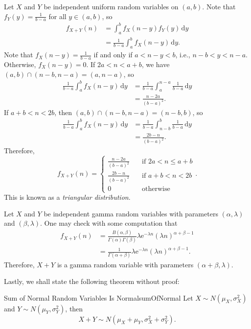 \documentclass[math]{amznotes}
\theoremstyle{remark}
\newcommand{\e}{\mathrm{e}}
\begin{document}
Let $X$ and $Y$ be independent uniform random variables on $(a, b)$. Note that $f_Y(y) = \frac{1}{b - a}$ for all $y \in (a, b)$, so
\begin{align*}
    f_{X + Y}(n) & = \int_{a}^{b}\!f_X(n - y)f_Y(y)\,\mathrm{d}y \\
    & = \frac{1}{b - a}\int_{a}^{b}\!f_X(n - y)\,\mathrm{d}y.
\end{align*}
Note that $f_X(n - y) = \frac{1}{b - a}$ if and only if $a < n - y < b$, i.e., $n - b < y < n - a$. Otherwise, $f_X(n - y) = 0$. If $2a < n < a + b$, we have $(a, b) \cap (n - b, n - a) = (a, n - a)$, so
\begin{align*}
    \frac{1}{b - a}\int_{a}^{b}\!f_X(n - y)\,\mathrm{d}y & = \frac{1}{b - a}\int_{a}^{n - a}\!\frac{1}{b - a}\,\mathrm{d}y \\
    & = \frac{n - 2a}{(b - a)^2}.
\end{align*}
If $a + b < n < 2b$, then $(a, b) \cap (n - b, n - a) = (n - b, b)$, so
\begin{align*}
    \frac{1}{b - a}\int_{a}^{b}\!f_X(n - y)\,\mathrm{d}y & = \frac{1}{b - a}\int_{n - b}^{b}\!\frac{1}{b - a}\,\mathrm{d}y \\
    & = \frac{2b - n}{(b - a)^2}.
\end{align*}
Therefore,
\begin{equation*}
    f_{X + Y}(n) = \begin{cases}
        \frac{n - 2a}{(b - a)^2} & \quad\textrm{if } 2a < n \leq a + b \\
        \frac{2b - n}{(b - a)^2} & \quad\textrm{if } a + b < n < 2b \\
        0 & \quad\textrm{otherwise}
    \end{cases}.
\end{equation*}
This is known as a \textit{triangular distribution}.

Let $X$ and $Y$ be independent gamma random variables with parameters $(\alpha, \lambda)$ and $(\beta, \lambda)$. One may check with some computation that
\begin{align*}
    f_{X + Y}(n) & = \frac{B(\alpha, \beta)}{\Gamma(\alpha)\Gamma(\beta)}\lambda\e^{-\lambda n}(\lambda n)^{\alpha + \beta - 1} \\
    & = \frac{1}{\Gamma(\alpha + \beta)}\lambda\e^{-\lambda n}(\lambda n)^{\alpha + \beta - 1}.
\end{align*}
Therefore, $X + Y$ is a gamma random variable with parameters $(\alpha + \beta, \lambda)$.

Lastly, we shall state the following theorem without proof:
\begin{thmbox}{Sum of Normal Random Variables Is Normal}{sumOfNormal}
    Let $X \sim N\left(\mu_X, \sigma_X^2\right)$ and $Y \sim N\left(\mu_Y, \sigma_Y^2\right)$, then 
    \begin{equation*}
        X + Y \sim N\left(\mu_X + \mu_Y, \sigma_X^2 + \sigma_Y^2\right).
    \end{equation*}
\end{thmbox}
\end{document}
